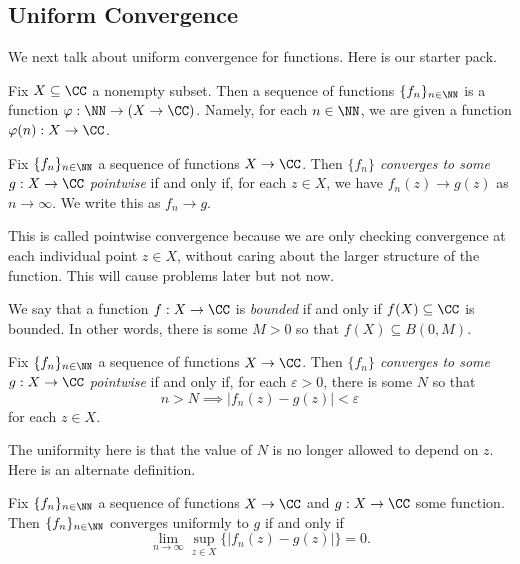 \subsection{Uniform Convergence}
We next talk about uniform convergence for functions. Here is our starter pack.
\begin{definition}
	Fix $X\subseteq\CC$ a nonempty subset. Then a sequence of functions $\{f_n\}_{n\in\NN}$ is a function $\varphi:\NN\to(X\to\CC)$. Namely, for each $n\in\NN$, we are given a function $\varphi(n):X\to\CC$.
\end{definition}
\begin{definition}
	Fix $\{f_n\}_{n\in\NN}$ a sequence of functions $X\to\CC$. Then \textit{$\{f_n\}$ converges to some $g:X\to\CC$ pointwise} if and only if, for each $z\in X$, we have $f_n(z)\to g(z)$ as $n\to\infty$. We write this as $f_n\to g$.
\end{definition}
This is called pointwise convergence because we are only checking convergence at each individual point $z\in X$, without caring about the larger structure of the function. This will cause problems later but not now.
\begin{definition}[Bounded]
	We say that a function $f:X\to\CC$ is \textit{bounded} if and only if $f(X)\subseteq\CC$ is bounded. In other words, there is some $M>0$ so that $f(X)\subseteq B(0,M)$.
\end{definition}
\begin{definition}
	Fix $\{f_n\}_{n\in\NN}$ a sequence of functions $X\to\CC$. Then \textit{$\{f_n\}$ converges to some $g:X\to\CC$ pointwise} if and only if, for each $\varepsilon>0$, there is some $N$ so that
	\[n>N\implies|f_n(z)-g(z)|<\varepsilon\]
	for each $z\in X$.
\end{definition}
The uniformity here is that the value of $N$ is no longer allowed to depend on $z$. Here is an alternate definition.
\begin{proposition} \label{prop:definefuncdist}
	Fix $\{f_n\}_{n\in\NN}$ a sequence of functions $X\to\CC$ and $g:X\to\CC$ some function. Then $\{f_n\}_{n\in\NN}$ converges uniformly to $g$ if and only if
	\[\lim_{n\to\infty}\sup_{z\in X}\{|f_n(z)-g(z)|\}=0.\]
\end{proposition}
